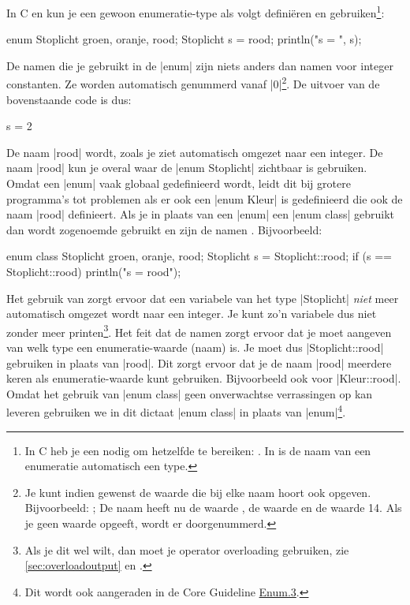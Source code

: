 \begin{cpplstShortInline}
In C en \Cpp{} kun je een gewoon enumeratie-type als volgt definiëren en gebruiken\footnote{%
	In C heb je een  nodig om hetzelfde te bereiken: . In \Cpp{} is de naam van een enumeratie automatisch een type. 
}:
\begin{cpplstfragment}
	enum Stoplicht {groen, oranje, rood};
	Stoplicht s = rood;
	println("s = {}", s);
\end{cpplstfragment}
De namen die je gebruikt in de |enum| zijn niets anders dan namen voor integer constanten. 
Ze worden automatisch genummerd vanaf |0|\footnote{%
	Je kunt indien gewenst de waarde die bij elke naam hoort ook opgeven.
	Bijvoorbeeld:
	;
	De naam  heeft nu de waarde ,  de waarde  en  de waarde 14. Als je geen waarde opgeeft, wordt er doorgenummerd.
}.
De uitvoer van de bovenstaande code is dus:
\begin{coutput}
	s = 2
\end{coutput}
De naam |rood| wordt, zoals je ziet automatisch omgezet naar een integer.
De naam |rood| kun je overal waar de |enum Stoplicht| zichtbaar is gebruiken.
Omdat een |enum| vaak globaal gedefinieerd wordt, leidt dit bij grotere programma's tot problemen als er ook een |enum Kleur| is gedefinieerd die ook de naam |rood| definieert.
Als je in plaats van een |enum| een |enum class| gebruikt dan wordt zogenoemde  gebruikt en zijn de namen .
Bijvoorbeeld:
\begin{cpplstfragment}
	enum class Stoplicht {groen, oranje, rood};
	Stoplicht s = Stoplicht::rood;
	if (s == Stoplicht::rood) println("s = rood");
\end{cpplstfragment}
Het gebruik van  zorgt ervoor dat een variabele van het type |Stoplicht| \emph{niet} meer automatisch omgezet wordt naar een integer.
Je kunt zo'n variabele dus niet zonder meer printen\footnote{%
	Als je dit wel wilt, dan moet je operator overloading gebruiken, zie \cref{sec:overloadoutput} en .
}.
Het feit dat de namen  zorgt ervoor dat je moet aangeven van welk type een enumeratie-waarde (naam) is. 
Je moet dus |Stoplicht::rood| gebruiken in plaats van |rood|. 
Dit zorgt ervoor dat je de naam |rood| meerdere keren als enumeratie-waarde kunt gebruiken.
Bijvoorbeeld ook voor |Kleur::rood|.
Omdat het gebruik van |enum class| geen onverwachtse verrassingen op kan leveren gebruiken we in dit dictaat |enum class| in plaats van |enum|\footnote{%
	Dit wordt ook aangeraden in de \Cpp{} Core Guideline \href{https://isocpp.github.io/CppCoreGuidelines/CppCoreGuidelines\#enum3-prefer-class-enums-over-plain-enums}{Enum.3}. 
}.


\end{cpplstShortInline}
